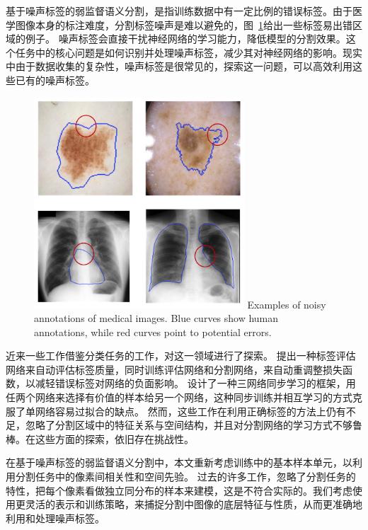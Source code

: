 基于噪声标签的弱监督语义分割，是指训练数据中有一定比例的错误标签。由于医学图像本身的标注难度，分割标签噪声是难以避免的，图~\ref{c1_fig3}给出一些标签易出错区域的例子。
噪声标签会直接干扰神经网络的学习能力，降低模型的分割效果。这个任务中的核心问题是如何识别并处理噪声标签，减少其对神经网络的影响。现实中由于数据收集的复杂性，噪声标签是很常见的，探索这一问题，可以高效利用这些已有的噪声标签。
    \begin{figure}[tbp]
        \centering 
        \includegraphics[width=0.7\textwidth]{img/c1/intro_3.png}
        {Examples of noisy annotations of medical images. Blue curves show human annotations, while red curves point to potential errors.}
        \label{c1_fig3}
    \end{figure}

近来一些工作借鉴分类任务的工作，对这一领域进行了探索。
\citet{Zhu2019PickandLearnAQ} 提出一种标签评估网络来自动评估标签质量，同时训练评估网络和分割网络，来自动重调整损失函数，以减轻错误标签对网络的负面影响。
\citet{Zhang2020RobustMI} 设计了一种三网络同步学习的框架，用任两个网络来选择有价值的样本给另一个网络，这种同步训练并相互学习的方式克服了单网络容易过拟合的缺点。
然而，这些工作在利用正确标签的方法上仍有不足，忽略了分割区域中的特征关系与空间结构，并且对分割网络的学习方式不够鲁棒。在这些方面的探索，依旧存在挑战性。

在基于噪声标签的弱监督语义分割中，本文重新考虑训练中的基本样本单元，以利用分割任务中的像素间相关性和空间先验。
过去的许多工作，忽略了分割任务的特性，把每个像素看做独立同分布的样本来建模，这是不符合实际的。我们考虑使用更灵活的表示和训练策略，来捕捉分割中图像的底层特征与性质，从而更准确地利用和处理噪声标签。


